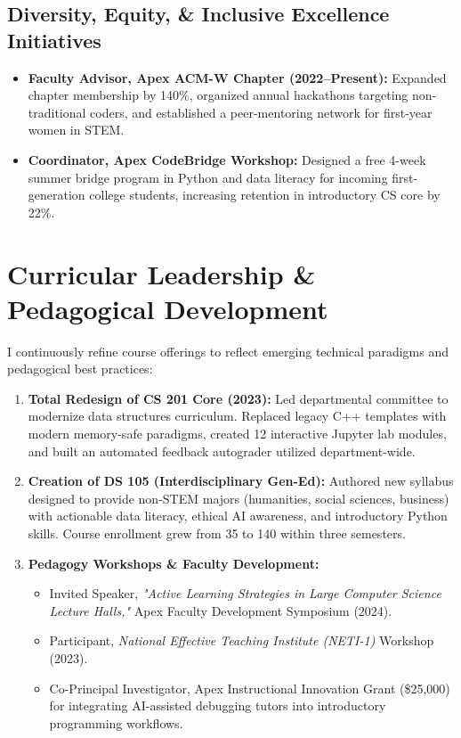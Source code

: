\documentclass[11pt,a4paper]{article}
\begin{document}
\subsection{Diversity, Equity, \& Inclusive Excellence Initiatives}
\begin{itemize}[leftmargin=1.5em, labelsep=0.5em, itemsep=3pt]
  \item \textbf{Faculty Advisor, Apex ACM-W Chapter (2022--Present):} Expanded chapter membership by 140\%, organized annual hackathons targeting non-traditional coders, and established a peer-mentoring network for first-year women in STEM.
  \item \textbf{Coordinator, Apex CodeBridge Workshop:} Designed a free 4-week summer bridge program in Python and data literacy for incoming first-generation college students, increasing retention in introductory CS core by 22\%.
\end{itemize}

\vspace{4pt}

\section{Curricular Leadership \& Pedagogical Development}

I continuously refine course offerings to reflect emerging technical paradigms and pedagogical best practices:

\begin{enumerate}[leftmargin=1.5em, labelsep=0.5em, itemsep=4pt]
  \item \textbf{Total Redesign of CS 201 Core (2023):} Led departmental committee to modernize data structures curriculum. Replaced legacy C++ templates with modern memory-safe paradigms, created 12 interactive Jupyter lab modules, and built an automated feedback autograder utilized department-wide.
  \item \textbf{Creation of DS 105 (Interdisciplinary Gen-Ed):} Authored new syllabus designed to provide non-STEM majors (humanities, social sciences, business) with actionable data literacy, ethical AI awareness, and introductory Python skills. Course enrollment grew from 35 to 140 within three semesters.
  \item \textbf{Pedagogy Workshops \& Faculty Development:}
    \begin{itemize}[leftmargin=1.2em, labelsep=0.4em, itemsep=2pt, topsep=2pt]
      \item Invited Speaker, \textit{"Active Learning Strategies in Large Computer Science Lecture Halls,"} Apex Faculty Development Symposium (2024).
      \item Participant, \textit{National Effective Teaching Institute (NETI-1)} Workshop (2023).
      \item Co-Principal Investigator, Apex Instructional Innovation Grant (\$25,000) for integrating AI-assisted debugging tutors into introductory programming workflows.
    \end{itemize}
\end{enumerate}
\end{document}
